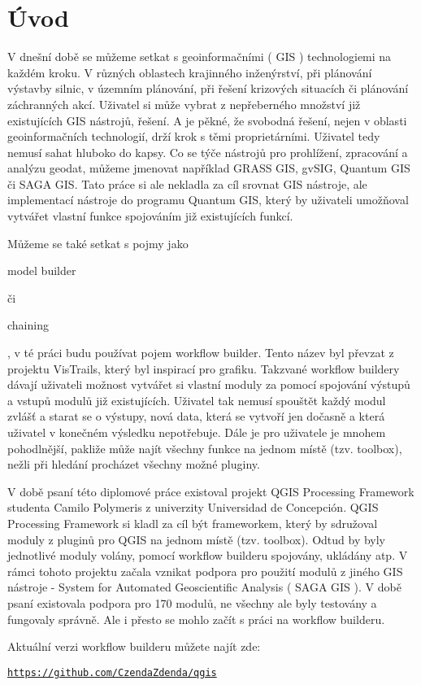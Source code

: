 \chapter*{Úvod}

V dnešní době se můžeme setkat s  geoinformačními ( GIS ) technologiemi na každém kroku. V různých oblastech krajinného inženýrství, při plánování výstavby silnic, v územním plánování, při řešení krizových situacích či plánování záchranných akcí. Uživatel si může vybrat z nepřeberného množství již existujících GIS nástrojů, řešení. A je pěkné, že svobodná řešení, nejen v oblasti geoinformačních technologií, drží krok s těmi proprietárními. Uživatel tedy nemusí sahat hluboko do kapsy. Co se týče nástrojů pro prohlížení, zpracování a analýzu  geodat, můžeme jmenovat například GRASS GIS, gvSIG, Quantum GIS či SAGA GIS. Tato práce si ale nekladla za cíl srovnat GIS nástroje, ale implementací nástroje do programu Quantum GIS, který by uživateli umožňoval vytvářet vlastní funkce spojováním již existujících funkcí.

Můžeme se také setkat s pojmy jako \begin{scriptsize}model builder\end{scriptsize} či \begin{scriptsize}chaining\end{scriptsize}, v té práci budu používat pojem workflow builder. Tento název byl převzat z projektu  VisTrails, který byl inspirací pro grafiku. Takzvané workflow buildery dávají uživateli možnost vytvářet si vlastní moduly za pomocí spojování výstupů a vstupů modulů již existujících. Uživatel tak nemusí spouštět každý modul zvlášť a starat se o výstupy, nová data, která se vytvoří jen dočasně a která uživatel v konečném výsledku nepotřebuje. Dále je pro uživatele je mnohem pohodlnější, pakliže může najít všechny funkce na jednom místě (tzv. toolbox), nežli při hledání procházet všechny možné pluginy.

V době psaní této diplomové práce existoval projekt  QGIS Processing Framework studenta Camilo Polymeris z univerzity Universidad de Concepción. QGIS Processing Framework si kladl za cíl být frameworkem, který by sdružoval moduly z pluginů pro QGIS na jednom místě (tzv. toolbox). Odtud by byly jednotlivé moduly volány, pomocí workflow builderu spojovány, ukládány atp. V rámci tohoto projektu začala vznikat podpora pro použití modulů z jiného GIS nástroje - System for Automated Geoscientific Analysis ( SAGA GIS ). V době psaní existovala podpora pro 170 modulů, ne všechny ale byly testovány a fungovaly správně. Ale i přesto se mohlo začít s práci na workflow builderu.

Aktuální verzi workflow builderu můžete najít zde:

\begin{center}
	\href{https://github.com/CzendaZdenda/qgis}{\texttt{https://github.com/CzendaZdenda/qgis}}
\end{center}